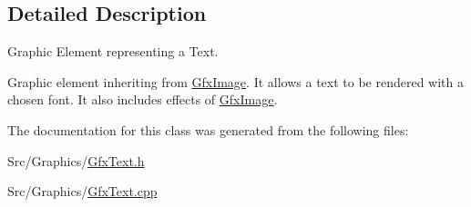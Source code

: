 \subsection{Detailed Description}
Graphic Element representing a Text. 

Graphic element inheriting from \hyperlink{classGfxImage}{Gfx\-Image}. It allows a text to be rendered with a chosen font. It also includes effects of \hyperlink{classGfxImage}{Gfx\-Image}. 

The documentation for this class was generated from the following files\-:\begin{DoxyCompactItemize}
\item 
Src/\-Graphics/\hyperlink{GfxText_8h}{Gfx\-Text.\-h}\item 
Src/\-Graphics/\hyperlink{GfxText_8cpp}{Gfx\-Text.\-cpp}\end{DoxyCompactItemize}
